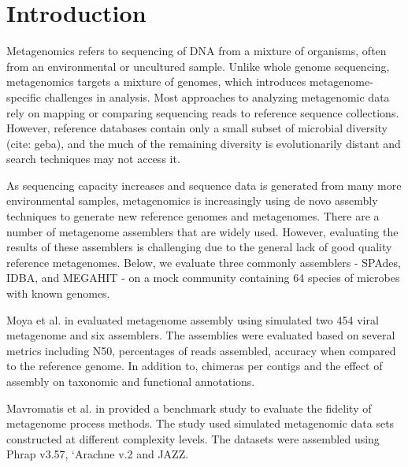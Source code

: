 \documentclass[10pt,a4paper,twocolumn]{article}
\begin{document}
\clearpage

\section*{Introduction}

Metagenomics refers to sequencing of DNA from a mixture of organisms,
often from an environmental or uncultured sample. Unlike whole genome
sequencing, metagenomics targets a mixture of genomes, which
introduces metagenome-specific challenges in analysis.  Most
approaches to analyzing metagenomic data rely on mapping or comparing
sequencing reads to reference sequence collections. However, reference
databases contain only a small subset of microbial diversity (cite:
geba), and the much of the remaining diversity is evolutionarily distant
and search techniques may not access it.

As sequencing capacity increases and sequence data is generated from
many more environmental samples, metagenomics is increasingly using de
novo assembly techniques to generate new reference genomes and
metagenomes.  There are a number of metagenome assemblers that are
widely used. However, evaluating the results of these assemblers is
challenging due to the general lack of good quality reference
metagenomes.  Below, we evaluate three commonly assemblers - SPAdes,
IDBA, and MEGAHIT - on a mock community containing 64 species of
microbes with known genomes.


 

 
Moya et al. in \cite{moya2014} evaluated metagenome assembly using
simulated two 454 viral metagenome and six assemblers. The assemblies
were evaluated based on several metrics including N50, percentages of
reads assembled, accuracy when compared to the reference genome. In
addition to, chimeras per contigs and the effect of assembly on
taxonomic and functional annotations.
 
Mavromatis et al. in \cite{mavromatis2007} provided a benchmark study
to evaluate the fidelity of metagenome process methods. The study used
simulated metagenomic data sets constructed at different complexity
levels.
The datasets were assembled using Phrap v3.57, `Arachne v.2
\cite{arachne} and JAZZ. \cite{jazz}
\end{document}
